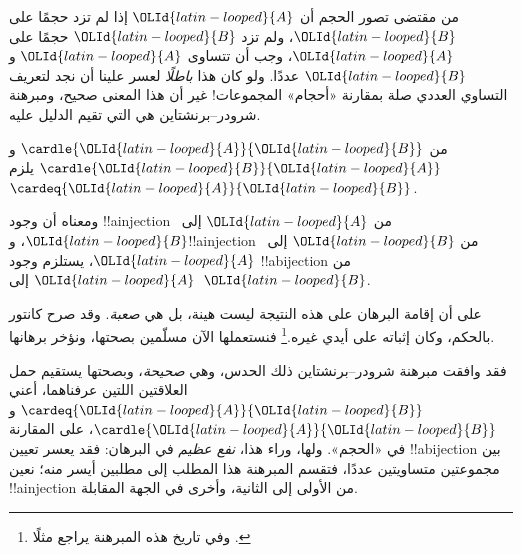 \documentclass[../../../include/open-logic-section]{subfiles}
\begin{document}


\begin{explain}
من مقتضى تصور الحجم أن ${\OLId{latin-looped}{A}}$ إذا لم تزد حجمًا على ${\OLId{latin-looped}{B}}$، ولم تزد ${\OLId{latin-looped}{B}}$ حجمًا على ${\OLId{latin-looped}{A}}$، وجب أن تتساوى ${\OLId{latin-looped}{A}}$ و${\OLId{latin-looped}{B}}$ عددًا. ولو كان هذا \emph{باطلًا} لعسر علينا أن نجد لتعريف التساوي العددي صلة بمقارنة «أحجام» المجموعات!{} غير أن هذا المعنى صحيح، ومبرهنة شرودر–برنشتاين هي التي تقيم الدليل عليه.
\end{explain}

\begin{thm}
من $\cardle{{\OLId{latin-looped}{A}}}{{\OLId{latin-looped}{B}}}$ و$\cardle{{\OLId{latin-looped}{B}}}{{\OLId{latin-looped}{A}}}$ يلزم $\cardeq{{\OLId{latin-looped}{A}}}{{\OLId{latin-looped}{B}}}$.
\end{thm}

\begin{explain}
ومعناه أن وجود !!a{injection} من ${\OLId{latin-looped}{A}}$ إلى~${\OLId{latin-looped}{B}}$، و!!a{injection} من ${\OLId{latin-looped}{B}}$ إلى~${\OLId{latin-looped}{A}}$، يستلزم وجود !!a{bijection} من ${\OLId{latin-looped}{A}}$ إلى~${\OLId{latin-looped}{B}}$.

على أن إقامة البرهان على هذه النتيجة ليست هينة، بل هي \emph{صعبة}. وقد صرح كانتور بالحكم، وكان إثباته على أيدي غيره.\footnote{وفي تاريخ هذه المبرهنة يراجع مثلًا \citet[ص~165--6]{Potter2004}.}
%
فنستعملها الآن مسلّمين بصحتها، ونؤخر برهانها.

فقد وافقت مبرهنة شرودر–برنشتاين ذلك الحدس، وهي \emph{صحيحة}، وبصحتها يستقيم حمل العلاقتين اللتين عرفناهما، أعني $\cardeq{{\OLId{latin-looped}{A}}}{{\OLId{latin-looped}{B}}}$ و$\cardle{{\OLId{latin-looped}{A}}}{{\OLId{latin-looped}{B}}}$، على المقارنة في «الحجم». ولها، وراء هذا، \emph{نفع عظيم} في البرهان: فقد يعسر تعيين !!a{bijection} بين مجموعتين متساويتين عددًا، فتقسم المبرهنة هذا المطلب إلى مطلبين أيسر منه؛ نعين !!a{injection} من الأولى إلى الثانية، وأخرى في الجهة المقابلة.
\end{explain}
\end{document}

